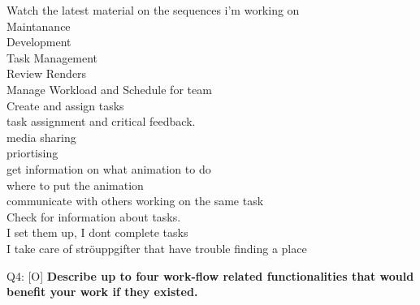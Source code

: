 \begin{adjustwidth}{0.3cm}{}
        Watch the latest material on the sequences i'm working on\\
        Maintanance\\
        Development\\
        Task Management\\
        Review Renders\\
        Manage Workload and Schedule for team\\
        Create and assign tasks\\
        task assignment and critical feedback.\\
        media sharing\\
        priortising\\
        get information on what animation to do\\
        where to put the animation\\
        communicate with others working on the same task\\
        Check for information about tasks.\\
        I set them up, I dont complete tasks\\
        I take care of ströuppgifter that have trouble finding a place \\
      \end{adjustwidth}

      Q4: [O] \textbf{%
        Describe up to four work-flow related functionalities that would benefit
        your work if they existed.
      } \\
      \label{subsec:ref_subsec_results_initial_Q4}
      

